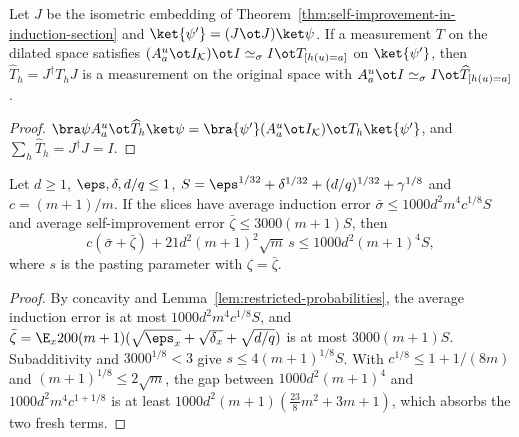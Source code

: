 \begin{lemma}[Compression]\label{lem:compression}
	\leanok
	Let $J$ be the isometric embedding of
	Theorem~\ref{thm:self-improvement-in-induction-section} and
	$\ket{\psi'}=(J\ot J)\ket\psi$.  If a measurement $T$ on the dilated space
	satisfies $(A^u_a\ot I_{\mathcal K})\ot I\simeq_\sigma I\ot T_{[h(u)=a]}$ on
	$\ket{\psi'}$, then $\widehat T_h=J^\dagger T_hJ$ is a measurement on the
	original space with $A^u_a\ot I\simeq_\sigma I\ot\widehat T_{[h(u)=a]}$.
\end{lemma}
\begin{proof}
	\leanok
	$\bra\psi A^u_a\ot\widehat T_h\ket\psi
		=\bra{\psi'}(A^u_a\ot I_{\mathcal K})\ot T_h\ket{\psi'}$, and
	$\sum_h\widehat T_h=J^\dagger J=I$.
\end{proof}

\begin{lemma}\label{lem:main-induction-recurrence}
	\leanok
	Let $d\ge1$, $\eps,\delta,d/q\le1$, $S=\eps^{1/32}+\delta^{1/32}+(d/q)^{1/32}+\gamma^{1/8}$
	and $c=(m+1)/m$.  If the slices have average induction error
	$\bar\sigma\le1000d^2m^4c^{1/8}S$ and average self-improvement error
	$\bar\zeta\le3000(m+1)S$, then
	\[
		c(\bar\sigma+\bar\zeta)+21d^2(m+1)^2\sqrt m\,s\le1000d^2(m+1)^4S,
	\]
	where $s$ is the pasting parameter with $\zeta=\bar\zeta$.
\end{lemma}
\begin{proof}
	\leanok
	By concavity and Lemma~\ref{lem:restricted-probabilities}, the average
	induction error is at most $1000d^2m^4c^{1/8}S$, and
	$\bar\zeta=\E_x200(m+1)(\sqrt{\eps_x}+\sqrt{\delta_x}+\sqrt{d/q})$ is at
	most $3000(m+1)S$.  Subadditivity and $3000^{1/8}<3$ give
	$s\le4(m+1)^{1/8}S$.  With $c^{1/8}\le1+1/(8m)$ and $(m+1)^{1/8}\le2\sqrt m$,
	the gap between $1000d^2(m+1)^4$ and $1000d^2m^4c^{1+1/8}$ is at least
	$1000d^2(m+1)(\frac{23}8m^2+3m+1)$, which absorbs the two fresh terms.
\end{proof}

